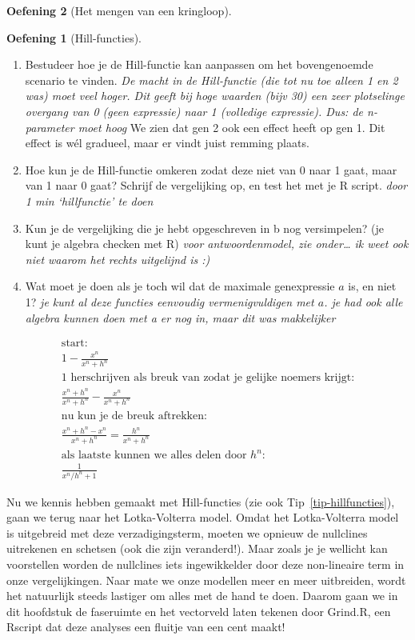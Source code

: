 \documentclass[
  a4paper,
]{scrbook}
\providecommand{\tightlist}{%
  \setlength{\itemsep}{0pt}\setlength{\parskip}{0pt}}\usepackage{longtable,booktabs,array}
\theoremstyle{definition}
\newtheorem{exercise}{Oefening}[chapter]
\theoremstyle{remark}
\begin{document}
\begin{exercise}[Het mengen van een
kringloop]
\begin{exercise}[Hill-functies]
\begin{enumerate}
\def\labelenumi{\alph{enumi}.}
\tightlist
\item
  Bestudeer hoe je de Hill-functie kan aanpassen om het bovengenoemde
  scenario te vinden. \emph{De macht in de Hill-functie (die tot nu toe
  alleen 1 en 2 was) moet veel hoger. Dit geeft bij hoge waarden (bijv
  30) een zeer plotselinge overgang van 0 (geen expressie) naar 1
  (volledige expressie). Dus: de n-parameter moet hoog} We zien dat gen
  2 ook een effect heeft op gen 1. Dit effect is wél gradueel, maar er
  vindt juist remming plaats.
\item
  Hoe kun je de Hill-functie omkeren zodat deze niet van 0 naar 1 gaat,
  maar van 1 naar 0 gaat? Schrijf de vergelijking op, en test het met je
  R script. \emph{door 1 min `hillfunctie' te doen}
\item
  Kun je de vergelijking die je hebt opgeschreven in b nog versimpelen?
  (je kunt je algebra checken met R) \emph{voor antwoordenmodel, zie
  onder\ldots{} ik weet ook niet waarom het rechts uitgelijnd is :)}
\item
  Wat moet je doen als je toch wil dat de maximale genexpressie \(a\)
  is, en niet 1? \emph{je kunt al deze functies eenvoudig
  vermenigvuldigen met \(a\). je had ook alle algebra kunnen doen met a
  er nog in, maar dit was makkelijker}
\end{enumerate}

\begin{align}
&\text{start:}\\
&1-\frac{x^n}{x^n+h^n} \\
&\text{1 herschrijven als breuk van zodat je gelijke noemers krijgt:} \\
&\frac{x^n+h^n}{x^n+h^n} - \frac{x^n}{x^n+h^n} \\
&\text{nu kun je de breuk aftrekken:} \\
& \frac{x^n+h^n-x^n}{x^n+h^n} = \frac{h^n}{x^n+h^n} \\
& \text{als laatste kunnen we alles delen door $h^n$:} \\
& \frac{1}{x^n/h^n+1}
& \end{align}

\end{exercise}

Nu we kennis hebben gemaakt met Hill-functies (zie ook
Tip~\ref{tip-hillfuncties}), gaan we terug naar het Lotka-Volterra
model. Omdat het Lotka-Volterra model is uitgebreid met deze
verzadigingsterm, moeten we opnieuw de nullclines uitrekenen en schetsen
(ook die zijn veranderd!). Maar zoals je je wellicht kan voorstellen
worden de nullclines iets ingewikkelder door deze non-lineaire term in
onze vergelijkingen. Naar mate we onze modellen meer en meer uitbreiden,
wordt het natuurlijk steeds lastiger om alles met de hand te doen.
Daarom gaan we in dit hoofdstuk de faseruimte en het vectorveld laten
tekenen door Grind.R, een Rscript dat deze analyses een fluitje van een
cent maakt!


\end{exercise}
\end{document}
